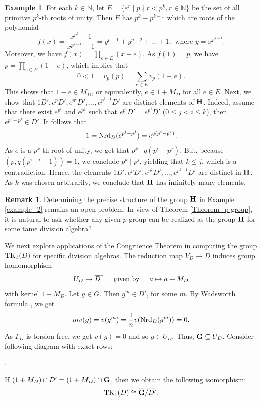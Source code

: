 \documentclass{amsart}
\theoremstyle{definition}
\newtheorem{example}{Example}
\newtheorem{remark}{Remark}
\numberwithin{equation}{section} %
\begin{document}
\begin{example}
	For each $k\in\mathbb{N}$, let $E=\{\varepsilon^r\mid p\nmid r<p^k, r\in \mathbb{N}\}$ be the set of all primitve $p^k$-th roots of unity. Then $E$ has $p^k-p^{k-1}$ which are roots of the polynomial
	$$
	f(x) = \dfrac{x^{p^k}-1}{x^{p^{k-1}}-1} = y^{p-1}+y^{p-2}+\ldots+1, \text{ where } y = x^{p^{k-1}}.
	$$
	Moreover, we have $f(x) = \prod\limits_{e \in E}(x-e)$. As $f(1) = p$, we have $p = \prod\limits_{e \in E}(1-e)$, which implies that 
	$$
	0<1 = v_p(p) = 
	\sum\limits_{e \in E} v_p(1-e).
	$$ 
	This shows that $1-e \in 
	M_D$, or equivalently, $e \in 1+M_D$ for all $e\in E$.  Next, we show that $1D',e^pD',e^{p^2}D',\ldots,e^{p^{k-1}}D'$ are distinct elements of ${\bf H}$. Indeed, assume that there exist $e^{p^i}$ and $e^{p^j}$ such that $e^{p^i}D' = 
	e^{p^j}D'$ ($0\le j<i \le k$), then $e^{p^i-p^j} \in D'$. It follows that 
	$$
	1={\rm Nrd}_D(e^{p^i-p^j}) = e^{q(p^i-p^j)}.
	$$
	As $e$ is a $p^{k}$-th root of unity, we get that $p^{k} \mid q(p^i-p^j)$. But, because $(p,q(p^{i-j}-1))= 1$, we conclude $p^k \mid p^j$, yielding that $k \le j$, which is a contradiction. Hence, the elements $1D',e^pD',e^{p^2}D',\ldots,e^{p^{k-1}}D'$ are distinct in ${\bf H}$. As $k$ was chosen arbitrarily, we conclude that ${\bf H}$ has infinitely many elements. 
\end{example}
\begin{remark}
	Determining the precise structure of the group ${\bf H}$ in Example \ref{example_2} remains an open problem. In view of Theorem \ref{Theorem_p-group}, it is natural to ask whether any given $p$-group can be realized as the group ${\bf H}$ for some  tame division algebra?
\end{remark}

We next explore applications of the Congruence Theorem in computing the group ${\rm TK}_1(D)$ for specific division algebras. The reduction map $V_D\to\overline{D}$ induces group homomorphism
$$
U_D\to\overline{D}^*\text{\;\;\;\; given by \;\;\;\;} a\mapsto a+M_D
$$
with kernel $1+M_D$. Let $g\in G$. Then $g^m\in D'$, for some $m$. By Wadsworth formula \cite{wadsworth-86}, we get 
$$
mv(g)=v(g^m)=\frac{1}{n}v({\rm Nrd}_D(g^m))=0.
$$
As $\Gamma_D$ is torsion-free, we get $v(g)=0$ and so $g\in U_D$. Thus, ${\bf G} \subseteq U_D$. Consider following diagram with exact rows:
\begin{center}
	.
\end{center}
If $(1+M_D)\cap D'=(1+M_D)\cap {\bf G}$, then we obtain the following isomorphism:
\begin{equation}\label{equation_isomorphic}
	{\rm TK}_1(D)\cong \overline{{\bf G}}/\overline{D'}.
\end{equation}
\end{document}
